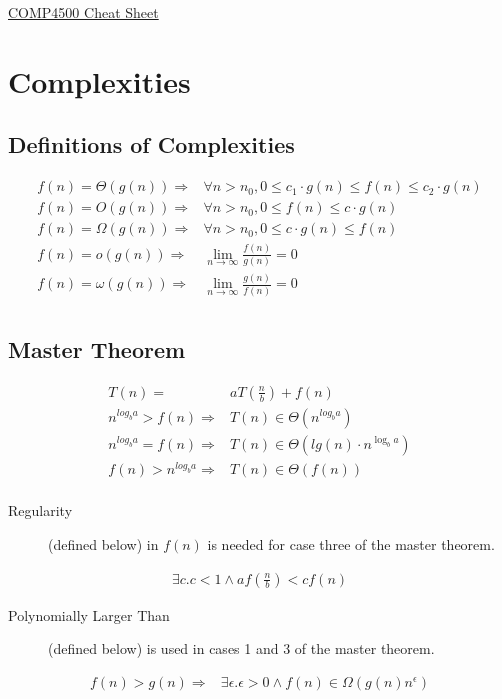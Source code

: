 \documentclass[landscape]{cheat}
\begin{document}
\footnotesize
\begin{multicols*}{3}

\begin{center}
\Large{\underline{COMP4500 Cheat Sheet}} \\
\end{center}

\section{Complexities}

\subsection{Definitions of Complexities}
\begin{align*}
    f(n) = \Theta(g(n)) \Rightarrow& \forall n > n_0, 0 \leq c_1 \cdot g(n) \leq f(n) \leq c_2 \cdot g(n) \\
    f(n) = O(g(n)) \Rightarrow& \forall n > n_0, 0 \leq f(n) \leq c \cdot g(n) \\
    f(n) = \Omega(g(n)) \Rightarrow& \forall n > n_0, 0 \leq c \cdot g(n) \leq f(n) \\
    f(n) = o(g(n)) \Rightarrow& \lim_{n \rightarrow \infty} \frac {f(n)} {g(n)} = 0 \\
    f(n) = \omega(g(n)) \Rightarrow& \lim_{n \rightarrow \infty} \frac {g(n)} {f(n)} = 0 \\
\end{align*}

\subsection{Master Theorem}
\begin{align*}
    T(n) =& a T\left(\frac n b\right) + f(n) \\
    n^{log_b a} > f(n) \Rightarrow& T(n) \in \Theta(n^{log_b a}) \\
    n^{log_b a} = f(n) \Rightarrow& T(n) \in \Theta(lg(n) \cdot n^{\log_b a}) \\
    f(n) > n^{log_b a} \Rightarrow& T(n) \in \Theta(f(n)) \\
\end{align*}

\begin{description}
    \item[Regularity] (defined below) in $f(n)$ is needed for case three of the master theorem.
\end{description}
\begin{align*}
    \exists c. c < 1 \land af\left(\frac n b\right) < cf(n)
\end{align*}
\begin{description}
    \item[Polynomially Larger Than] (defined below) is used in cases 1 and 3 of the master theorem.
\end{description}
\begin{align*}
    f(n) > g(n) \Rightarrow& \exists \epsilon. \epsilon > 0 \land f(n) \in \Omega(g(n) n^\epsilon)
\end{align*}


\end{multicols*}
\end{document}
